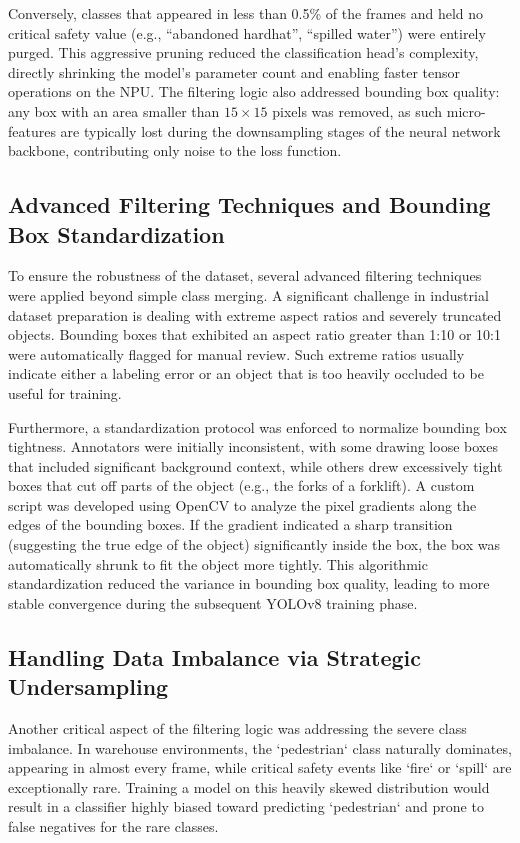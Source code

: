 Conversely, classes that appeared in less than 0.5\% of the frames and held no critical safety value (e.g., ``abandoned hardhat'', ``spilled water'') were entirely purged. This aggressive pruning reduced the classification head's complexity, directly shrinking the model's parameter count and enabling faster tensor operations on the NPU. The filtering logic also addressed bounding box quality: any box with an area smaller than $15 \times 15$ pixels was removed, as such micro-features are typically lost during the downsampling stages of the neural network backbone, contributing only noise to the loss function.

\subsection{Advanced Filtering Techniques and Bounding Box Standardization}
To ensure the robustness of the dataset, several advanced filtering techniques were applied beyond simple class merging. A significant challenge in industrial dataset preparation is dealing with extreme aspect ratios and severely truncated objects. Bounding boxes that exhibited an aspect ratio greater than 1:10 or 10:1 were automatically flagged for manual review. Such extreme ratios usually indicate either a labeling error or an object that is too heavily occluded to be useful for training.

Furthermore, a standardization protocol was enforced to normalize bounding box tightness. Annotators were initially inconsistent, with some drawing loose boxes that included significant background context, while others drew excessively tight boxes that cut off parts of the object (e.g., the forks of a forklift). A custom script was developed using OpenCV to analyze the pixel gradients along the edges of the bounding boxes. If the gradient indicated a sharp transition (suggesting the true edge of the object) significantly inside the box, the box was automatically shrunk to fit the object more tightly. This algorithmic standardization reduced the variance in bounding box quality, leading to more stable convergence during the subsequent YOLOv8 training phase.

\subsection{Handling Data Imbalance via Strategic Undersampling}
Another critical aspect of the filtering logic was addressing the severe class imbalance. In warehouse environments, the `pedestrian` class naturally dominates, appearing in almost every frame, while critical safety events like `fire` or `spill` are exceptionally rare. Training a model on this heavily skewed distribution would result in a classifier highly biased toward predicting `pedestrian` and prone to false negatives for the rare classes.

